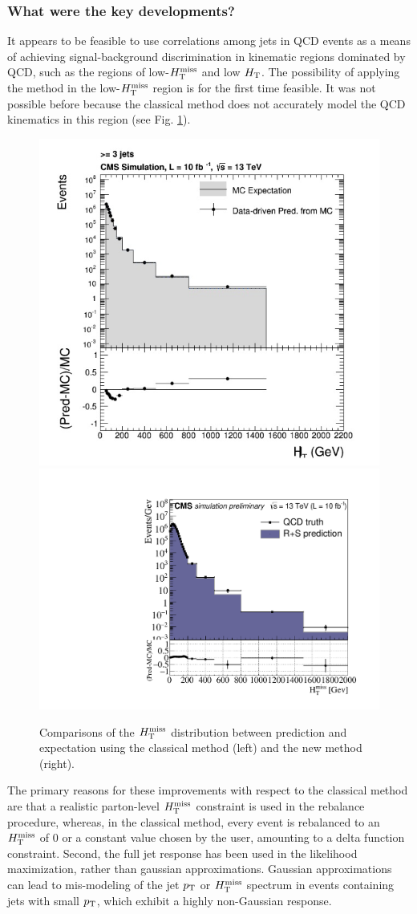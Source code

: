\subsubsection{What were the key developments?}
It appears to be feasible to use correlations among jets in QCD events as a means of achieving signal-background discrimination in kinematic regions dominated by QCD, such as the regions of low-$H_{\text{T}}^{\rm miss}$ and low $H_{\rm T}$. The possibility of applying the method in the low-$H_{\text{T}}^{\rm miss}$ region is for the first time feasible. It was not possible before because the classical method does not accurately model the QCD kinematics in this region (see Fig. \ref{fig:OldVsNew}). 
\begin{figure}[h]
\centering
\includegraphics[width=0.49\linewidth]{figures/SusySearches/Ra2b2016/RnSClassicMht.jpg}
\includegraphics[width=0.49\linewidth]{figures/SusySearches/Ra2b2016/LowDeltaPhi_MhtForComparison.pdf}
\caption{Comparisons of the $H_{\text{T}}^{\rm miss}$ distribution between prediction and expectation using the classical method (left) and the new method (right).}
\label{fig:OldVsNew}
\end{figure}
The primary reasons for these improvements with respect to the classical method are that a realistic parton-level $H_{\text{T}}^{\rm miss}$ constraint is used in the rebalance procedure, whereas, in the classical method, every event is rebalanced to an $H_{\text{T}}^{\rm miss}$ of 0 or a constant value chosen by the user, amounting to a delta function constraint. Second, the full jet response has been used in the likelihood maximization, rather than gaussian approximations. Gaussian approximations can lead to mis-modeling of the jet $p_{\text{T}}$ or $H_{\text{T}}^{\rm miss}$ spectrum in events containing jets with small $p_{\text{T}}$, which exhibit a highly non-Gaussian response. 

